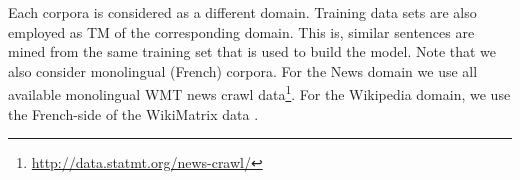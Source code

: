 \begin{table}[!ht]
\begin{center}
\end{center}
\caption{\label{tab:corpora-chap8} Corpora statistics. Note that K stands for thousands and $L_{mean}$ is the average length in words.}
\end{table}

Each corpora is considered as a different domain. Training data sets are also employed as TM of the corresponding domain.
This is, similar sentences are mined from the same training set that is used to build the model.
%
Note that we also consider monolingual (French) corpora. 
For the News domain we use all available monolingual WMT news crawl data\footnote{\url{http://data.statmt.org/news-crawl/}}.
For the Wikipedia domain, we use the French-side of the WikiMatrix data \cite{Schwenk19wikimatrix}.

